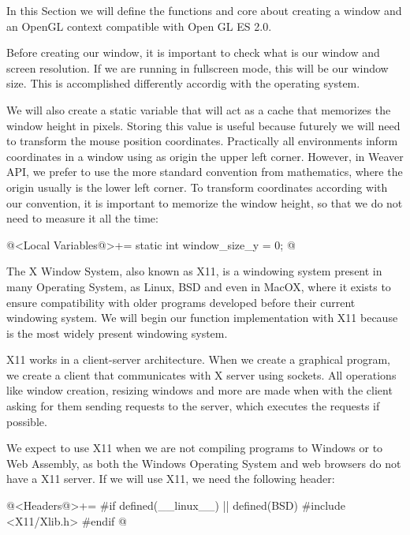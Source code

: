 
In this Section we will define the functions and core about creating a
window and an OpenGL context compatible with Open GL ES 2.0.


Before creating our window, it is important to check what is our
window and screen resolution. If we are running in fullscreen mode,
this will be our window size. This is accomplished differently
accordig with the operating system.

We will also create a static variable that will act as a cache that
memorizes the window height in pixels. Storing this value is useful
because futurely we will need to transform the mouse position
coordinates. Practically all environments inform coordinates in a
window using as origin the upper left corner. However, in Weaver API,
we prefer to use the more standard convention from mathematics, where
the origin usually is the lower left corner. To transform coordinates
according with our convention, it is important to memorize the window
height, so that we do not need to measure it all the time:

\iniciocodigo
@<Local Variables@>+=
static int window_size_y = 0;
@
\fimcodigo


The X Window System, also known as X11, is a windowing system present
in many Operating System, as Linux, BSD and even in MacOX, where it
exists to ensure compatibility with older programs developed before
their current windowing system. We will begin our function
implementation with X11 because is the most widely present windowing
system.

X11 works in a client-server architecture. When we create a graphical
program, we create a client that communicates with X server using
sockets. All operations like window creation, resizing windows and
more are made when with the client asking for them sending requests to
the server, which executes the requests if possible.

We expect to use X11 when we are not compiling programs to Windows or
to Web Assembly, as both the Windows Operating System and web browsers
do not have a X11 server. If we will use X11, we need the following
header:

\iniciocodigo
@<Headers@>+=
#if defined(__linux__) || defined(BSD)
#include <X11/Xlib.h>
#endif
@
\fimcodigo

